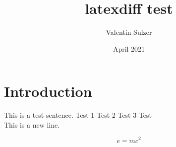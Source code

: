 \documentclass{article}
\title{latexdiff test}
\author{Valentin Sulzer}
\date{April 2021}
\begin{document}
\maketitle

\section{Introduction}

This is a test sentence.
Test 1
Test 2
Test 3
Test 
\\This is a new line.

\begin{equation}
    e = mc^2
\end{equation}
\end{document}

